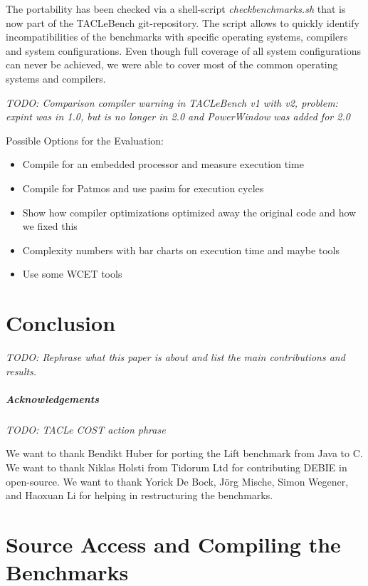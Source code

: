 \documentclass[a4paper,UKenglish]{oasics}
\newcommand{\todo}[1]{{\emph{TODO: #1}}}
\begin{document}
The portability has been checked via a shell-script \textit{checkbenchmarks.sh} that is now part of the TACLeBench git-repository.
The script allows to quickly identify incompatibilities of the benchmarks with specific operating systems, compilers and system configurations.
Even though full coverage of all system configurations can never be achieved, we were able to cover most of the common operating systems and compilers.


\todo{Comparison compiler warning in TACLeBench v1 with v2, problem: expint was in 1.0, but is no
longer in 2.0 and PowerWindow was added for 2.0}

Possible Options for the Evaluation:

\begin{itemize}
\item Compile for an embedded processor and measure execution time
\item Compile for Patmos and use pasim for execution cycles
\item Show how compiler optimizations optimized away the original code and how we fixed this
\item Complexity numbers with bar charts on execution time and maybe tools
\item Use some WCET tools
\end{itemize}


\section{Conclusion}
\label{sec:conclusion}

\todo{Rephrase what this paper is about and list the main contributions and results.}

\subparagraph*{Acknowledgements}

\todo{TACLe COST action phrase}

We want to thank Bendikt Huber for porting the Lift benchmark from Java to C.
We want to thank Niklas Holsti from Tidorum Ltd for contributing DEBIE in open-source.
We want to thank Yorick De Bock, J{\"o}rg Mische, Simon Wegener, and Haoxuan Li for helping in restructuring the benchmarks.

\appendix
\section{Source Access and Compiling the Benchmarks}



\end{document}
